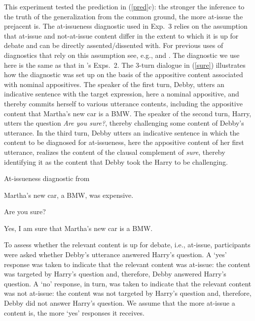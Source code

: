\documentclass[11pt,fleqn]{article}
\newcommand{\6}{\mbox{$[\hspace*{-.6mm}[$}}
\newcommand{\9}{\mbox{$]\hspace*{-.6mm}]$}}
\newcommand{\citepos}[1]{\citeauthor{#1}'s \citeyear{#1}}
\begin{document}
This experiment tested the prediction in (\ref{pred}c): the stronger the inference to the truth of the generalization from the common ground, the more at-issue the prejacent is. The at-issueness diagnostic used in Exp.~3 relies on the assumption that at-issue and not-at-issue content differ in the extent to which it is up for debate and can be directly assented/dissented with. For previous uses of diagnostics that rely on this assumption see, e.g., \citealt{amaral-etal07,xue-onea11,murray2014,anderbois-etal2015,destruel-etal2015,tonhauser-sula6} and \citealt{syrett-koev2015}. The diagnostic we use here is the same as that in \citepos{tbd-variability} Exps.~2. The 3-turn dialogue in (\ref{sure}) illustrates how the diagnostic was set up on the basis of the appositive content associated with nominal appositives. The speaker of the first turn, Debby, utters an indicative sentence with the target expression, here a nominal appositive, and thereby commits herself to various utterance contents, including the appositive content that Martha's new car is a BMW. The speaker of the second turn, Harry, utters the question {\em Are you sure?}, thereby challenging some content of Debby's utterance. In the third turn, Debby utters an indicative sentence in which the content to be diagnosed for at-issueness, here the appositive content of her first utterance, realizes the content of the clausal complement of {\em sure}, thereby identifying it as the content that Debby took the Harry to be challenging. 

\begin{exe}
\ex\label{sure} At-issueness diagnostic from \citealt{tbd-variability}
\begin{xlist}
 Martha's new car, a BMW, was expensive.

 Are you sure?

 Yes, I am sure that Martha's new car is a BMW. 
\end{xlist}
\end{exe}

To assess whether the relevant content is up for debate, i.e., at-issue, participants were asked whether Debby's utterance answered Harry's question. A `yes' response was taken to indicate that the relevant content was at-issue: the content was targeted by Harry's question and, therefore, Debby answered Harry's question. A `no' response, in turn, was taken to indicate that the relevant content was not at-issue: the content was not targeted by Harry's question and, therefore, Debby did not answer Harry's question. We assume that the more at-issue a content is, the more `yes' responses it receives.
\end{document}
